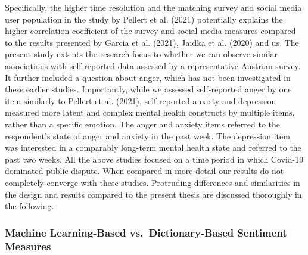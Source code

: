 \documentclass[
  english,
  jou,floatsintext]{apa7}
\begin{document}
Specifically, the higher time resolution and the matching survey and social media user population in the study by Pellert et al. (2021) potentially explains the higher correlation coefficient of the survey and social media measures compared to the results presented by Garcia et al. (2021), Jaidka et al. (2020) and us. The present study extents the research focus to whether we can observe similar associations with self-reported data assessed by a representative Austrian survey. It further included a question about anger, which has not been investigated in these earlier studies. Importantly, while we assessed self-reported anger by one item similarly to Pellert et al. (2021), self-reported anxiety and depression measured more latent and complex mental health constructs by multiple items, rather than a specific emotion. The anger and anxiety items referred to the respondent's state of anger and anxiety in the past week. The depression item was interested in a comparably long-term mental health state and referred to the past two weeks.
All the above studies focused on a time period in which Covid-19 dominated public dispute.
When compared in more detail our results do not completely converge with these studies. Protruding differences and similarities in the design and results compared to the present thesis are discussed thoroughly in the following.

\hypertarget{machine-learning-based-vs.-dictionary-based-sentiment-measures}{%
\subsubsection{Machine Learning-Based vs.~Dictionary-Based Sentiment Measures}\label{machine-learning-based-vs.-dictionary-based-sentiment-measures}}
\end{document}
